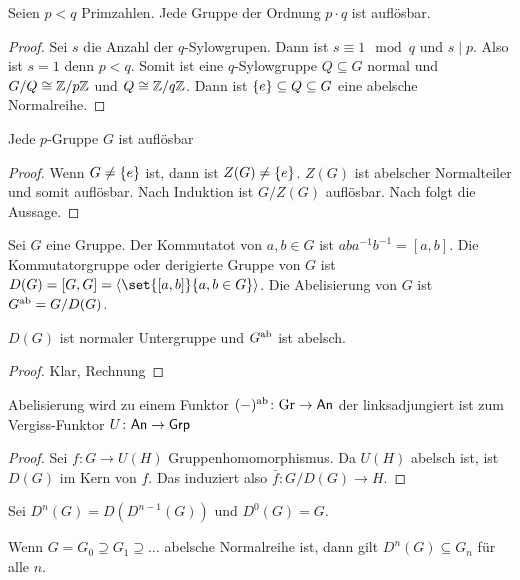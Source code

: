 \begin{Satz}
    Seien \(p<q\) Primzahlen. Jede Gruppe der Ordnung \(p\cdot q\) ist auflösbar.
\end{Satz}
\begin{proof}
    Sei \(s\) die Anzahl der \(q\)-Sylowgrupen. Dann ist \(s\equiv 1\mod q\) und \(s\mid p\). Also ist \(s=1\) denn \(p<q\). Somit ist eine \(q\)-Sylowgruppe \(Q\subseteq G\) normal und \(G/Q\cong \mathbb{Z}/p\mathbb{Z}\) und \(Q\cong\mathbb{Z}/q\mathbb{Z}\). Dann ist \(\{e\}\subseteq Q\subseteq G\) eine abelsche Normalreihe.
\end{proof}
\begin{Satz}
    Jede \(p\)-Gruppe \(G\) ist auflösbar
\end{Satz}
\begin{proof}
    Wenn \(G\neq \{e\}\) ist, dann ist \(Z(G)\neq \{e\}\). \(Z(G)\) ist abelscher Normalteiler und somit auflösbar. Nach Induktion ist \(G/Z(G)\) auflösbar. Nach  folgt die Aussage.
\end{proof}
\begin{Def}
    Sei \(G\) eine Gruppe. Der Kommutatot von \(a,b\in G\) ist \(aba^{-1}b^{-1}=[a,b]\).
    Die Kommutatorgruppe oder derigierte Gruppe von \(G\) ist \(D(G)=[G,G]=\anglebr{\set{[a,b]}{a,b\in G}}\). Die Abelisierung von \(G\) ist \(G^{\mathrm{ab}}=G/D(G)\).
\end{Def}
\begin{Lemma}
    \(D(G)\) ist normaler Untergruppe und \(G^{\mathrm{ab}}\) ist abelsch.
\end{Lemma}
\begin{proof}
    Klar, Rechnung
\end{proof}
\begin{Satz}
    Abelisierung wird zu einem Funktor \((-)^{\mathrm{ab}}\colon\mathrm{Gr}\to\mathsf{An}\) der linksadjungiert ist zum Vergiss-Funktor \(U\colon \mathsf{An}\to \mathsf{Grp}\)
\end{Satz}
\begin{proof}
    Sei \(f\colon G\to U(H)\) Gruppenhomomorphismus. Da \(U(H)\) abelsch ist, ist \(D(G)\) im Kern von \(f\). Das induziert also \(\bar f\colon G/D(G)\to H\).
\end{proof}
\begin{Def}
    Sei \(D^n(G)=D(D^{n-1}(G))\) und \(D^0(G)=G.\)
\end{Def}
\begin{Bem}
    Wenn \(G=G_0\supseteq G_1\supseteq\dots\) abelsche Normalreihe ist, dann gilt \(D^n(G)\subseteq G_n\) für alle \(n\).
\end{Bem}

